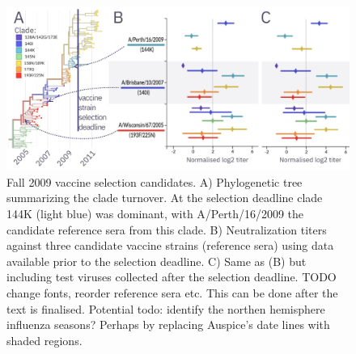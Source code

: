 \documentclass[utf8]{FrontiersinHarvard} %
\begin{document}
\begin{figure}[h!]
  \begin{center}
    \includegraphics[width=\textwidth]{figures/figure-3.jpg}
  \end{center}
  \caption{
    Fall 2009 vaccine selection candidates.
    A) Phylogenetic tree summarizing the clade turnover. At the selection deadline clade 144K (light blue) was dominant, with A/Perth/16/2009 the candidate reference sera from this clade.
    B) Neutralization titers against three candidate vaccine strains (reference sera) using data available prior to the selection deadline.
    C) Same as (B) but including test viruses collected after the selection deadline.
    \break
    TODO change fonts, reorder reference sera etc. This can be done after the text is finalised.
    \break
    Potential todo: identify the northen hemisphere influenza seasons? Perhaps by replacing Auspice's date lines with shaded regions.
  }
  \label{fig:3}
\end{figure}
\end{document}
